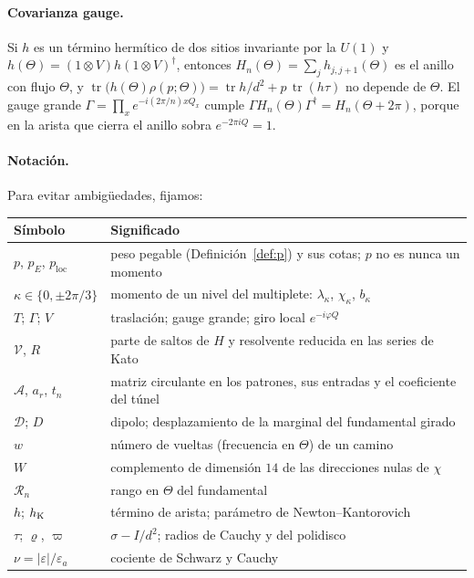 \documentclass[11pt,a4paper]{article}
\theoremstyle{definition}
\theoremstyle{remark}
\newcommand{\tr}{\operatorname{tr}}
\newcommand{\eps}{\varepsilon}
\newcommand{\pE}{p_{E}}
\newcommand{\ploc}{p_{\mathrm{loc}}}
\begin{document}
\paragraph{Covarianza gauge.} Si $h$ es un término hermítico de dos sitios invariante por la $U(1)$ y
$h(\Theta)=(1\otimes V)h(1\otimes V)^\dagger$, entonces $H_n(\Theta)=\sum_jh_{j,j+1}(\Theta)$ es el
anillo con flujo $\Theta$, y $\tr\big(h(\Theta)\rho(p;\Theta)\big)=\tr h/d^2+p\,\tr(h\tau)$ no depende
de $\Theta$. El gauge grande $\Gamma=\prod_xe^{-i(2\pi/n)xQ_x}$ cumple $\Gamma H_n(\Theta)\Gamma^\dagger=H_n(\Theta+2\pi)$,
porque en la arista que cierra el anillo sobra $e^{-2\pi iQ}=1$.

\paragraph{Notación.} Para evitar ambigüedades, fijamos:
\begin{center}
\begin{tabular}{>{\raggedright}p{3.2cm}>{\raggedright\arraybackslash}p{11.3cm}}
\toprule
Símbolo & Significado\\
\midrule
$p$, $\pE$, $\ploc$ & peso pegable (Definición~\ref{def:p}) y sus cotas; $p$ no es nunca un momento\\
$\kappa\in\{0,\pm2\pi/3\}$ & momento de un nivel del multiplete: $\lambda_\kappa$, $\chi_\kappa$, $b_\kappa$\\
$T$; $\Gamma$; $V$ & traslación; gauge grande; giro local $e^{-i\varphi Q}$\\
$\mathcal V$, $R$ & parte de saltos de $H$ y resolvente reducida en las series de Kato\\
$\mathcal A$, $a_r$, $t_n$ & matriz circulante en los patrones, sus entradas y el coeficiente del túnel\\
$\mathcal D$; $D$ & dipolo; desplazamiento de la marginal del fundamental girado\\
$w$ & número de vueltas (frecuencia en $\Theta$) de un camino\\
$W$ & complemento de dimensión $14$ de las direcciones nulas de $\chi$\\
$\mathcal R_n$ & rango en $\Theta$ del fundamental\\
$h$; $h_{\rm K}$ & término de arista; parámetro de Newton--Kantorovich\\
$\tau$; $\varrho$, $\varpi$ & $\sigma-I/d^2$; radios de Cauchy y del polidisco\\
$\nu=|\eps|/\eps_a$ & cociente de Schwarz y Cauchy\\
\bottomrule
\end{tabular}
\end{center}
\end{document}
